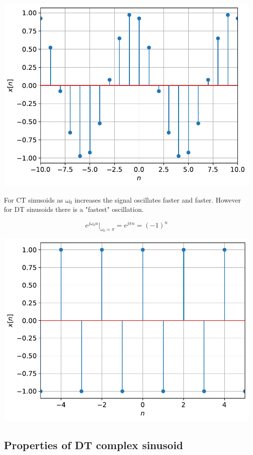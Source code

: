 \begin{center}
\includegraphics[scale=0.6]{graphics/dtsinusoid.pdf}
\end{center}

For CT sinusoids as $\omega_0$ increases the signal oscillates faster and faster. However for DT sinusoids there is a "fastest" oscillation.

\[
e^{j\omega_0 n}\rvert_{\omega_0 = \pi} = e^{j\pi n} = (-1)^n
\]

\includegraphics[scale=0.5]{graphics/dtfastsin.pdf}

\subsection{Properties of DT complex sinusoid}

